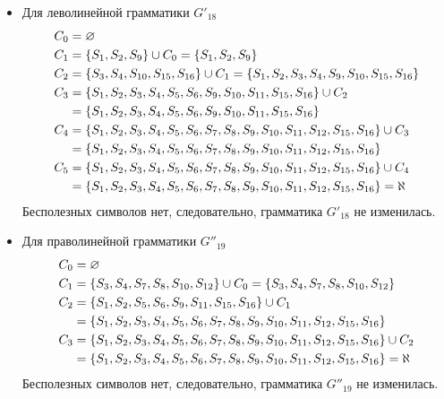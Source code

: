 \begin{itemize}
	\item Для леволинейной грамматики \(G'_{18}\)
	      \begin{align*}
		      C_0   & = \varnothing                                                                                               \\
		      C_{1} & = \left\{S_1, S_2, S_9\right\} \cup C_0 = \left\{S_1, S_2, S_9\right\}                                                        \\
		      C_{2} & = \left\{S_3, S_4, S_{10}, S_{15}, S_{16}\right\} \cup C_{1} = \left\{S_1, S_2, S_3, S_4, S_9, S_{10}, S_{15}, S_{16}\right\} \\
		      C_{3} & = \left\{S_1, S_2, S_3, S_4, S_5, S_6, S_9, S_{10}, S_{11}, S_{15}, S_{16}\right\} \cup C_{2}                        \\
		            & = \left\{S_1, S_2, S_3, S_4, S_5, S_6, S_9, S_{10}, S_{11}, S_{15}, S_{16}\right\}                                   \\
		      C_{4} & = \left\{S_1, S_2, S_3, S_4, S_5, S_6, S_7, S_8, S_9, S_{10}, S_{11}, S_{12}, S_{15}, S_{16}\right\} \cup C_{3}      \\
		            & = \left\{S_1, S_2, S_3, S_4, S_5, S_6, S_7, S_8, S_9, S_{10}, S_{11}, S_{12}, S_{15}, S_{16}\right\}                 \\
		      C_{5} & = \left\{S_1, S_2, S_3, S_4, S_5, S_6, S_7, S_8, S_9, S_{10}, S_{11}, S_{12}, S_{15}, S_{16}\right\} \cup C_{4}      \\
		            & = \left\{S_1, S_2, S_3, S_4, S_5, S_6, S_7, S_8, S_9, S_{10}, S_{11}, S_{12}, S_{15}, S_{16}\right\} = \aleph
	      \end{align*}
	      Бесполезных символов нет, следовательно, грамматика \(G'_{18}\) не изменилась.
	\item Для праволинейной грамматики \(G''_{19}\)
	      \begin{align*}
		      C_0   & = \varnothing                                                                                          \\
		      C_{1} & = \left\{S_3, S_4, S_7, S_8, S_{10}, S_{12}\right\} \cup C_0 = \left\{S_3, S_4, S_7, S_8, S_{10}, S_{12}\right\}         \\
		      C_{2} & = \left\{S_1, S_2, S_5, S_6, S_9, S_{11}, S_{15}, S_{16}\right\} \cup C_{1}                                     \\
		            & = \left\{S_1, S_2, S_3, S_4, S_5, S_6, S_7, S_8, S_9, S_{10}, S_{11}, S_{12}, S_{15}, S_{16}\right\}            \\
		      C_{3} & = \left\{S_1, S_2, S_3, S_4, S_5, S_6, S_7, S_8, S_9, S_{10}, S_{11}, S_{12}, S_{15}, S_{16}\right\} \cup C_{2} \\
		            & = \left\{S_1, S_2, S_3, S_4, S_5, S_6, S_7, S_8, S_9, S_{10}, S_{11}, S_{12}, S_{15}, S_{16}\right\} = \aleph
	      \end{align*}
	      Бесполезных символов нет, следовательно, грамматика \(G''_{19}\) не изменилась.
\end{itemize}
